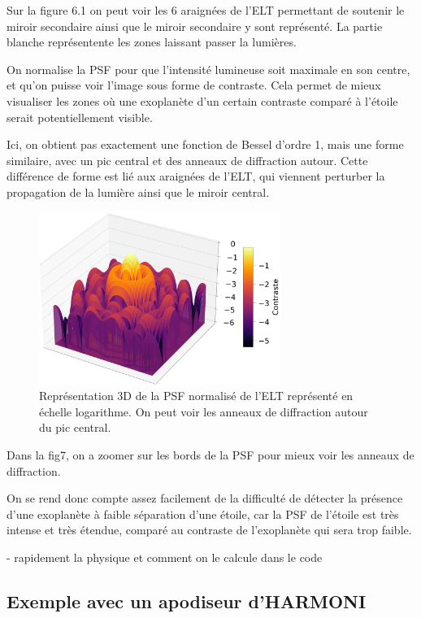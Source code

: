 Sur la figure 6.1 on peut voir les 6 araignées de l'ELT permettant de soutenir le miroir secondaire ainsi que le miroir secondaire y sont représenté. La partie blanche représentente les zones laissant passer la lumières.

On normalise la PSF pour que l'intensité lumineuse soit maximale en son centre, et qu'on puisse voir l'image sous forme de contraste. Cela permet de mieux visualiser les zones où une exoplanète d'un certain contraste comparé à l'étoile serait potentiellement visible.

Ici, on obtient pas exactement une fonction de Bessel d'ordre 1, mais une forme similaire, avec un pic central et des anneaux de diffraction autour. Cette différence de forme est lié aux araignées de l'ELT, qui viennent perturber la propagation de la lumière ainsi que le miroir central.

\begin{figure}[htbp]
\centering
\includegraphics[width=0.7\textwidth]{figures/PSF_ELT_3D_bord.png}
\caption{Représentation 3D de la PSF normalisé de l'ELT représenté en échelle logarithme. On peut voir les anneaux de diffraction autour du pic central.}
\end{figure}

Dans la fig7, on a zoomer sur les bords de la PSF pour mieux voir les anneaux de diffraction.

On se rend donc compte assez facilement de la difficulté de détecter la présence d'une exoplanète à faible séparation d'une étoile, car la PSF de l'étoile est très intense et très étendue, comparé au contraste de l'exoplanète qui sera trop faible.

- rapidement la physique et comment on le calcule dans le code

\subsection{Exemple avec un apodiseur d'HARMONI}

